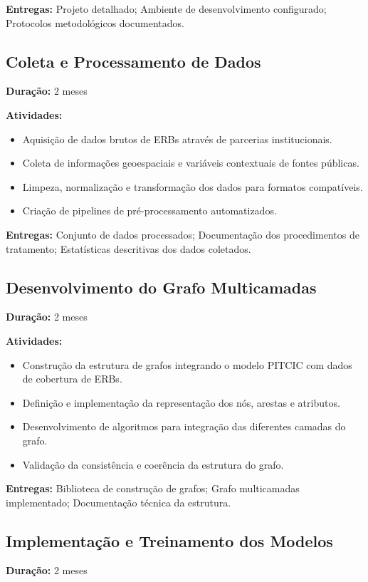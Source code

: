 \textbf{Entregas:} Projeto detalhado; Ambiente de desenvolvimento configurado; Protocolos metodológicos documentados.

\subsection{Coleta e Processamento de Dados}
\textbf{Duração:} 2 meses

\textbf{Atividades:}
\begin{itemize}[noitemsep]
    \item Aquisição de dados brutos de \gls{ERB}s através de parcerias institucionais.
    \item Coleta de informações geoespaciais e variáveis contextuais de fontes públicas.
    \item Limpeza, normalização e transformação dos dados para formatos compatíveis.
    \item Criação de pipelines de pré-processamento automatizados.
\end{itemize}

\textbf{Entregas:} Conjunto de dados processados; Documentação dos procedimentos de tratamento; Estatísticas descritivas dos dados coletados.

\subsection{Desenvolvimento do Grafo Multicamadas}
\textbf{Duração:} 2 meses

\textbf{Atividades:}
\begin{itemize}[noitemsep]
    \item Construção da estrutura de grafos integrando o modelo \gls{PITCIC} com dados de cobertura de \gls{ERB}s.
    \item Definição e implementação da representação dos nós, arestas e atributos.
    \item Desenvolvimento de algoritmos para integração das diferentes camadas do grafo.
    \item Validação da consistência e coerência da estrutura do grafo.
\end{itemize}

\textbf{Entregas:} Biblioteca de construção de grafos; Grafo multicamadas implementado; Documentação técnica da estrutura.

\subsection{Implementação e Treinamento dos Modelos}
\textbf{Duração:} 2 meses

